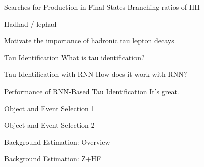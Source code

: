\documentclass[11pt, xcolor={dvipsnames}, aspectratio=169]{beamer}
\begin{document}

\begin{frame}{Searches for \HH Production in \bbtautau Final States}
  Branching ratios of HH

  Hadhad / lephad

  Motivate the importance of hadronic tau lepton decays
\end{frame}


\begin{frame}{Tau Identification}
  What is tau identification?
\end{frame}


\begin{frame}{Tau Identification with RNN}
  How does it work with RNN?
\end{frame}


\begin{frame}{Performance of RNN-Based Tau Identification}
  It's great.
\end{frame}


\begin{frame}{Object and Event Selection 1}
\end{frame}


\begin{frame}{Object and Event Selection 2}
\end{frame}


\begin{frame}{Background Estimation: Overview}
\end{frame}


\begin{frame}{Background Estimation: Z+HF}
\end{frame}
\end{document}
